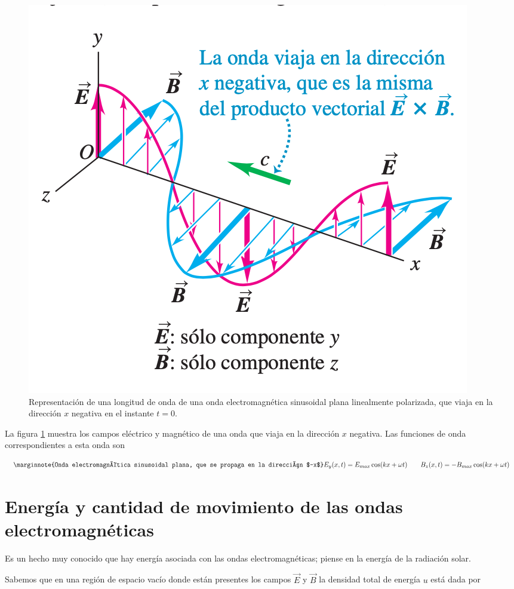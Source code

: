 \begin{figure}
\centering
\includegraphics[scale=0.5]{fig/sinusoidal2}
\caption{Representación de una longitud de onda de una onda electromagnética sinusoidal plana linealmente polarizada, que viaja en la dirección $x$ negativa en el instante $t = 0$.}
\label{fig:sinusoidal2}
\end{figure}

La figura \ref{fig:sinusoidal2} muestra los campos eléctrico y magnético de una onda que viaja en la dirección $x$ negativa. Las funciones de onda correspondientes a esta onda son

\begin{equation}\label{32.19}\marginnote{Onda electromagnética sinusoidal plana, que se propaga en la dirección $-x$}
E_y(x,t)=E_{max}\cos (kx+\omega t)\qquad B_z(x,t)=-B_{max}\cos (kx+\omega t)
\end{equation}

\section{Energía y cantidad de movimiento de las ondas electromagnéticas}
Es un hecho muy conocido que hay energía asociada con las ondas electromagnéticas; piense en la energía de la radiación solar. 

Sabemos que en una región de espacio vacío donde están presentes los campos $\vec{E}$ y $\vec{B}$ la densidad total de energía $u$ está dada por

